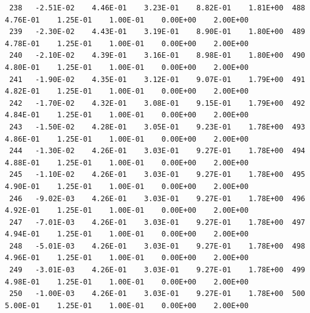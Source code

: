 \documentclass[10pt,letterpaper,notitlepage]{article}
\numberwithin{equation}{section}
\begin{document}
\begin{appendices}
{\begin{verbatim}
 238   -2.51E-02    4.46E-01    3.23E-01    8.82E-01    1.81E+00  488    4.76E-01    1.25E-01    1.00E-01    0.00E+00    2.00E+00
 239   -2.30E-02    4.43E-01    3.19E-01    8.90E-01    1.80E+00  489    4.78E-01    1.25E-01    1.00E-01    0.00E+00    2.00E+00
 240   -2.10E-02    4.39E-01    3.16E-01    8.98E-01    1.80E+00  490    4.80E-01    1.25E-01    1.00E-01    0.00E+00    2.00E+00
 241   -1.90E-02    4.35E-01    3.12E-01    9.07E-01    1.79E+00  491    4.82E-01    1.25E-01    1.00E-01    0.00E+00    2.00E+00
 242   -1.70E-02    4.32E-01    3.08E-01    9.15E-01    1.79E+00  492    4.84E-01    1.25E-01    1.00E-01    0.00E+00    2.00E+00
 243   -1.50E-02    4.28E-01    3.05E-01    9.23E-01    1.78E+00  493    4.86E-01    1.25E-01    1.00E-01    0.00E+00    2.00E+00
 244   -1.30E-02    4.26E-01    3.03E-01    9.27E-01    1.78E+00  494    4.88E-01    1.25E-01    1.00E-01    0.00E+00    2.00E+00
 245   -1.10E-02    4.26E-01    3.03E-01    9.27E-01    1.78E+00  495    4.90E-01    1.25E-01    1.00E-01    0.00E+00    2.00E+00
 246   -9.02E-03    4.26E-01    3.03E-01    9.27E-01    1.78E+00  496    4.92E-01    1.25E-01    1.00E-01    0.00E+00    2.00E+00
 247   -7.01E-03    4.26E-01    3.03E-01    9.27E-01    1.78E+00  497    4.94E-01    1.25E-01    1.00E-01    0.00E+00    2.00E+00
 248   -5.01E-03    4.26E-01    3.03E-01    9.27E-01    1.78E+00  498    4.96E-01    1.25E-01    1.00E-01    0.00E+00    2.00E+00
 249   -3.01E-03    4.26E-01    3.03E-01    9.27E-01    1.78E+00  499    4.98E-01    1.25E-01    1.00E-01    0.00E+00    2.00E+00
 250   -1.00E-03    4.26E-01    3.03E-01    9.27E-01    1.78E+00  500    5.00E-01    1.25E-01    1.00E-01    0.00E+00    2.00E+00
\end{verbatim}
}
\end{appendices}
\end{document}
